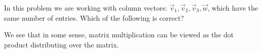 \documentclass{ximera}
\author{Bart Snapp}
\begin{document}
\begin{exercise}
  In this problem we are working with column vectors: $\vec{v}_{1}, \vec{v}_{2}, \vec{v}_{3}, \vec{w}$, which have
  the same number of entries. Which of the following is correct?
  \begin{multipleChoice}
  \end{multipleChoice}
  \begin{feedback}[correct]
    We see that in some sense, matrix multiplication can be viewed as
    the dot product distributing over the matrix.
  \end{feedback}
\end{exercise}
\end{document}
